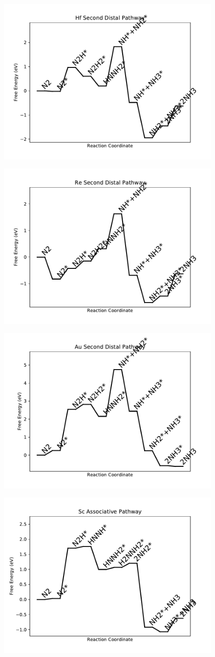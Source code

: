 \documentclass[journal=jacsat,manuscript=article]{achemso}
\begin{document}
\begin{figure}
\includegraphics[width=0.5\linewidth]{data/plots/Hf_distal_2.pdf}
\label{fig:Hf_distal_2}
\end{figure}

\begin{figure}
\includegraphics[width=0.5\linewidth]{data/plots/Re_distal_2.pdf}
\label{fig:Re_distal_2}
\end{figure}

\begin{figure}
\includegraphics[width=0.5\linewidth]{data/plots/Au_distal_2.pdf}
\label{fig:Au_distal_2}
\end{figure}

\begin{figure}
\includegraphics[width=0.5\linewidth]{data/plots/Sc_associative.pdf}
\label{fig:Sc_associative}
\end{figure}
\end{document}
